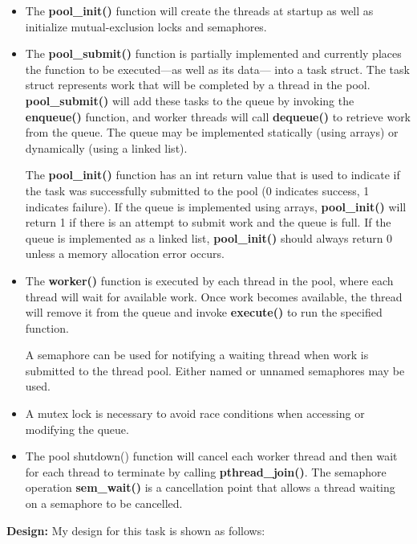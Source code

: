 \documentclass[UTF8,10pt,a4paper]{article}
\theoremstyle{Problem}
\theoremstyle{Solution}
\begin{document}
\begin{itemize}
    \item The \textbf{\textbf{pool\_init()}} function will create the threads at startup as well as initialize mutual-exclusion locks and semaphores.
    \item The \textbf{pool\_submit()} function is partially implemented and currently places the function to be executed—as well as its data— into a task struct. The task struct represents work that will be completed by a thread in the pool. \textbf{pool\_submit()} will add these tasks to the queue by invoking the \textbf{enqueue()} function, and worker threads will call \textbf{dequeue()} to retrieve work from the queue. The queue may be implemented statically (using arrays) or dynamically (using a linked list).

    The \textbf{pool\_init()} function has an int return value that is used to indicate if the task was successfully submitted to the pool (0 indicates success, 1 indicates failure). If the queue is implemented using arrays, \textbf{pool\_init()} will return 1 if there is an attempt to submit work and the queue is full. If the queue is implemented as a linked list, \textbf{pool\_init()} should always return 0 unless a memory allocation error occurs.
    
    \item The \textbf{worker()} function is executed by each thread in the pool, where each thread will wait for available work. Once work becomes available, the thread will remove it from the queue and invoke \textbf{execute()} to run the specified function.

    A semaphore can be used for notifying a waiting thread when work is submitted to the thread pool. Either named or unnamed semaphores may be used.
    
    \item A mutex lock is necessary to avoid race conditions when accessing or modifying the queue.
    
    \item The pool shutdown() function will cancel each worker thread and then wait for each thread to terminate by calling \textbf{pthread\_join()}. The semaphore operation \textbf{sem\_wait()} is a cancellation point that allows a thread waiting on a semaphore to be cancelled.
\end{itemize}


\newpage

\textbf{Design:} My design for this task is shown as follows:
\end{document}
